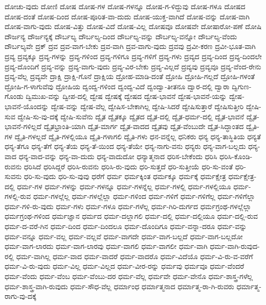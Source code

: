 {ದೋಚು-ವುದು
ದೋಣಿ
ದೋಷ
ದೋಷ-ಗಳ
ದೋಷ-ಗಳನ್ನೂ
ದೋಷ-ಗ-ಳಿದ್ದುವು
ದೋಷ-ಗಳೂ
ದೋಷದ
ದೋಷ-ದಂತೆ
ದೋಷ-ದಿಂದ
ದೋಷ-ಪೂರಿತ-ವಾ-ದುದು
ದೋಷ-ಯುಕ್ತ-ವಾಗಿದೆ
ದೋಷ-ವನ್ನು
ದೋಷ-ವಾಗಿ
ದೋಷ-ವಾಗು-ವುದು
ದೋಷ-ವಿತ್ತು
ದೋಷ-ವಿದೆ
ದೋಷ-ವಿಲ್ಲ
ದೋಷವೂ
ದೋಷವೇ
ದೋಷಾರೋ-ಪಣೆ
ದೋಷಿ
ದೌರ್ಜನ್ಯ
ದೌರ್ಜನ್ಯಕ್ಕೆ
ದೌರ್ಬಲ್ಯ
ದೌರ್ಬಲ್ಯ-ದಿಂದ
ದೌರ್ಬಲ್ಯ-ವನ್ನು
ದೌರ್ಬಲ್ಯ-ವನ್ನೋ
ದೌರ್ಬಲ್ಯ-ವೆಂದು
ದೌರ್ಬಲ್ಯವೇ
ದ್ರಕ್
ದ್ರವ
ದ್ರವ-ವಾಗ-ಬೇಕು
ದ್ರವ-ವಾಗಿ
ದ್ರವ-ವಾಗು-ವುದು
ದ್ರವವು
ದ್ರವೀ-ಕರಣ
ದ್ರವೀ-ಭೂತ-ವಾಗಿ
ದ್ರವ್ಯ
ದ್ರವ್ಯಕ್ಕೂ
ದ್ರವ್ಯ-ಗಳನ್ನು
ದ್ರವ್ಯ-ಗಳಿಂದ
ದ್ರವ್ಯ-ಗಳಿಗೂ
ದ್ರವ್ಯ-ಗಳಿಗೆ
ದ್ರವ್ಯ-ಗಳು
ದ್ರವ್ಯದ
ದ್ರವ್ಯ-ದಿಂದ
ದ್ರವ್ಯ-ದಿಂದಲೇ
ದ್ರವ್ಯ-ದೊಂದಿಗೆ
ದ್ರವ್ಯ-ವನ್ನು
ದ್ರವ್ಯ-ವಾಗು-ವುದು
ದ್ರವ್ಯ-ವಿರ-ಬೇಕು
ದ್ರವ್ಯ-ವಿಲ್ಲದೆ
ದ್ರವ್ಯವು
ದ್ರವ್ಯವೂ
ದ್ರವ್ಯ-ವೆಂದ-ರೇನು
ದ್ರವ್ಯ-ವೆಲ್ಲ
ದ್ರವ್ಯವೇ
ದ್ರಾಕ್ಷಿ
ದ್ರಾಕ್ಷಿ-ಗೊನೆ
ದ್ರಾಕ್ಷಿಯ
ದ್ರೋಹ-ಮಾಡಿ-ದಂತೆ
ದ್ರೋಹಿ
ದ್ರೋಹಿ-ಗಲ್ಲದೆ
ದ್ರೋಹಿ-ಗಳಂತೆ
ದ್ರೋಹಿ-ಗ-ಳಾಗುವೆವು
ದ್ರೋಹಿಯ
ದ್ವಂದ್ವ-ಗಳಿಂದ
ದ್ವಂದ್ವ-ವಿದೆ
ದ್ವಂದ್ವಾ-ತೀತನೂ
ದ್ವಾರ-ದಲ್ಲಿ
ದ್ವಾರಾ
ದ್ವಿಗುಣ-ಗೊಂಡು
ದ್ವಿಮುಖ-ವನ್ನು
ದ್ವೀಪ-ದಲ್ಲಿ
ದ್ವೇಷ
ದ್ವೇಷಕ್ಕೆ
ದ್ವೇಷದ
ದ್ವೇಷ-ಭಾವನೆ
ದ್ವೇಷ-ಭಾವನೆ-ಯನ್ನು
ದ್ವೇಷ-ಭಾವನೆ-ಯೊಂದನ್ನು
ದ್ವೇಷ-ವನ್ನು
ದ್ವೇಷ-ವೆಲ್ಲ
ದ್ವೇಷಿಸ-ಬೇಕಾಗಿಲ್ಲ
ದ್ವೇಷಿ-ಸಿದರೆ
ದ್ವೇಷಿಸುತ್ತಾರೆ
ದ್ವೇಷಿಸುತ್ತೀರಿ
ದ್ವೇಷಿ-ಸುವ
ದ್ವೇಷಿ-ಸು-ವು-ದಕ್ಕೆ
ದ್ವೇಷಿ-ಸುವೆನು
ದ್ವೈತ
ದ್ವೈತಕ್ಕೂ
ದ್ವೈತದ
ದ್ವೈತ-ದಲ್ಲಿ
ದ್ವೈತ-ಧರ್ಮ-ದಲ್ಲಿ
ದ್ವೈತ-ಭಾವನೆ
ದ್ವೈತ-ಭಾವನೆ-ಗಳಿಲ್ಲದೆ
ದ್ವೈತಭ್ರಾಂತಿ-ಯಾಗಿ
ದ್ವೈತ-ಮಾರ್ಗ
ದ್ವೈತ-ವಾದದ
ದ್ವೈತವು
ದ್ವೈತ-ವೆಂಬುದೇ
ದ್ವೈತ-ಸಿದ್ಧಾಂತದ
ದ್ವೈತಿ-ಗಳ
ದ್ವೈತಿ-ಗಳಲ್ಲದೆ
ದ್ವೈತಿ-ಗಳಲ್ಲಿಯೂ
ದ್ವೈತಿ-ಗಳಾಗಲಿ
ದ್ವೈತಿ-ಗಳು
ಧನ-ವನ್ನೆಲ್ಲ
ಧನಿಕರು
ಧನ್ಯ
ಧನ್ಯ-ತಾಸ್ಥಿತಿಯ
ಧನ್ಯತೆ
ಧನ್ಯ-ತೆಗೂ
ಧನ್ಯ-ತೆಗೆ
ಧನ್ಯ-ತೆಯ
ಧನ್ಯ-ತೆ-ಯಿಂದ
ಧನ್ಯ-ತೆಯೇ
ಧನ್ಯ-ನಾಗು-ವನು
ಧನ್ಯರು
ಧನ್ಯ-ವಾಗ-ಬಲ್ಲದು
ಧನ್ಯ-ವಾದ
ಧನ್ಯ-ವಾದ-ವನ್ನು
ಧನ್ಯ-ವಾ-ದುದು
ಧನ್ಯ-ವಾದುದೋ
ಧನ್ಯಾತ್ಮನಾದ
ಧರಿಸ-ಬೇಕೆಂದು
ಧರಿಸಿ
ಧರಿಸಿ-ಕೊಂಡಿ-ರುವನು
ಧರಿಸಿದೆ
ಧರಿಸಿದ್ದರೆ
ಧರಿಸಿ-ರುವನು
ಧರಿಸಿ-ರು-ವುದು
ಧರಿ-ಸುತ್ತದೆ
ಧರಿ-ಸುತ್ತೀಯೆ
ಧರಿ-ಸು-ವಂತೆ
ಧರಿ-ಸುವನು
ಧರಿ-ಸು-ವುದು
ಧರಿ-ಸು-ವುವು
ಧರೆಗೆ
ಧರ್ಮ
ಧರ್ಮಕ್ಕಿಂತ
ಧರ್ಮಕ್ಕೂ
ಧರ್ಮಕ್ಕೆ
ಧರ್ಮಕ್ಷೇತ್ರ
ಧರ್ಮಕ್ಷೇತ್ರ-ದಲ್ಲಿ
ಧರ್ಮ-ಗಳ
ಧರ್ಮ-ಗಳನ್ನು
ಧರ್ಮ-ಗಳನ್ನೂ
ಧರ್ಮ-ಗಳನ್ನೆಲ್ಲ
ಧರ್ಮ-ಗಳಲ್ಲಿ
ಧರ್ಮ-ಗಳಲ್ಲಿಯೂ
ಧರ್ಮ-ಗಳಲ್ಲಿ-ರುವ
ಧರ್ಮ-ಗಳಲ್ಲೆಲ್ಲ
ಧರ್ಮ-ಗಳಲ್ಲೆಲ್ಲಾ
ಧರ್ಮ-ಗಳಿಂದ
ಧರ್ಮ-ಗಳಿಗೆ
ಧರ್ಮ-ಗಳಿಗೆಲ್ಲ
ಧರ್ಮ-ಗಳಿಗೆಲ್ಲಾ
ಧರ್ಮ-ಗಳಿ-ರು-ವುದು
ಧರ್ಮ-ಗಳು
ಧರ್ಮ-ಗಳೂ
ಧರ್ಮ-ಗಳೆಲ್ಲ
ಧರ್ಮ-ಗಿರಿ-ದುರ್ಗದ
ಧರ್ಮಗ್ರಂಥ-ಗಳಲ್ಲೆಲ್ಲಾ
ಧರ್ಮಗ್ರಂಥ-ಗಳಿಂದ
ಧರ್ಮಜ್ಞಾನ
ಧರ್ಮದ
ಧರ್ಮ-ದಲ್ಲಾಗಲಿ
ಧರ್ಮ-ದಲ್ಲಿ
ಧರ್ಮ-ದಲ್ಲಿಯೂ
ಧರ್ಮ-ದಲ್ಲಿ-ರುವ
ಧರ್ಮ-ದ-ವರೆ-ಗಿನ
ಧರ್ಮ-ದಿಂದ
ಧರ್ಮ-ದಿಂದಲೂ
ಧರ್ಮ-ದೊಂದಿಗೂ
ಧರ್ಮ-ವನ್ನಾ-ದರೂ
ಧರ್ಮ-ವನ್ನು
ಧರ್ಮ-ವನ್ನೂ
ಧರ್ಮ-ವಲ್ಲ
ಧರ್ಮ-ವಲ್ಲವೆ
ಧರ್ಮ-ವಾಗದೇ
ಧರ್ಮ-ವಾಗ-ಬಲ್ಲದೆ
ಧರ್ಮ-ವಾಗ-ಬಲ್ಲದೋ
ಧರ್ಮ-ವಾಗ-ಲಾರದು
ಧರ್ಮ-ವಾಗ-ಲಾರವು
ಧರ್ಮ-ವಾಗಲಿ
ಧರ್ಮ-ವಾಗಲೀ
ಧರ್ಮ-ವಾಗಿ
ಧರ್ಮ-ವಾಗಿ-ರುವುದ-ರಲ್ಲಿ
ಧರ್ಮ-ವಾಗಿಲ್ಲ
ಧರ್ಮ-ವಾದ
ಧರ್ಮ-ವಾದರೆ
ಧರ್ಮ-ವಾದರೊ
ಧರ್ಮ-ವಿದೆಯೊ
ಧರ್ಮ-ವಿ-ರು-ವ-ವರೆಗೆ
ಧರ್ಮ-ವಿ-ರು-ವುದು
ಧರ್ಮ-ವಿಲ್ಲ
ಧರ್ಮ-ವಿಲ್ಲದ
ಧರ್ಮ-ವೀರ-ರನ್ನು
ಧರ್ಮವು
ಧರ್ಮವೂ
ಧರ್ಮ-ವೆಂದರೆ
ಧರ್ಮ-ವೆಂದು
ಧರ್ಮ-ವೆಂಬ
ಧರ್ಮ-ವೆಂಬು-ದರ
ಧರ್ಮ-ವೆಲ್ಲ
ಧರ್ಮವೇ
ಧರ್ಮ-ವೇನೊ
ಧರ್ಮ-ಶಾಸ್ತ್ರ-ಗಳೆಲ್ಲ
ಧರ್ಮ-ಶಾಸ್ತ್ರ-ವಾಗಿ-ರುವುದು
ಧರ್ಮ-ಸೌಧ-ವೆಲ್ಲ
ಧರ್ಮಾಂಧ
ಧರ್ಮಾತ್ಮನಾದ
ಧರ್ಮಾತ್ಮ-ರಾ-ಗಿ-ರುವರು
ಧರ್ಮಾತ್ಮ-ರಾಗು-ವು-ದಕ್ಕೆ
}
